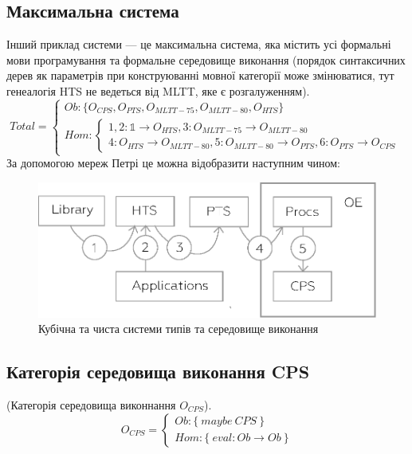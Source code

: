 \subsection{Максимальна система}
Інший приклад системи --- це максимальна система, яка містить усі формальні
мови програмування та формальне середовище виконання (порядок синтаксичних дерев
як параметрів при конструюванні мовної категорії може змінюватися, тут
генеалогія HTS не ведеться від MLTT, яке є розгалуженням).
\begin{equation}
Total =
\begin{cases}
Ob: \{ O_{CPS}, O_{PTS}, O_{MLTT-75}, O_{MLTT-80}, O_{HTS} \} \\
Hom: \begin{cases}
1,2: \mathbb{1} \rightarrow O_{HTS}, 3: O_{MLTT-75} \rightarrow O_{MLTT-80} \\
4: O_{HTS} \rightarrow O_{MLTT-80}, 5: O_{MLTT-80} \rightarrow O_{PTS}, 6: O_{PTS} \rightarrow O_{CPS}
\end{cases}
\end{cases}
\end{equation}
За допомогою мереж Петрі це можна відобразити наступним чином:
\begin{center}
\begin{figure}[ht]
  \centerline{\includegraphics[scale=0.6]{higher.eps}}
  \caption{Кубічна та чиста системи типів та середовище виконання}
\end{figure}
\end{center}


\newpage
\subsection{Категорія середовища виконання CPS}
\begin{definition} (Категорія середовища виконнання $O_{CPS}$).
$$
O_{CPS} =
\begin{cases}
Ob: \{\ maybe\ CPS\ \} \\
Hom: \{\ eval: Ob \rightarrow Ob\ \}
\end{cases}
$$
\end{definition}


